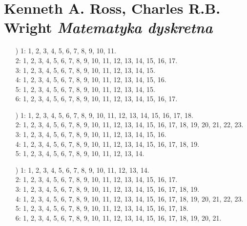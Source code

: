 \documentclass[a4paper,11pt]{article}
\numberwithin{equation}{section}
\begin{document}










\section{Kenneth A. Ross, Charles R.B. Wright
  \textit{Matematyka dyskretna}}

\label{sec:Oznaczenia-i-konwencje}


\begin{itemize}

\item[\romannumeral1)] 1: 1, 2, 3, 4, 5, 6, 7, 8, 9, 10, 11. \\
  2: 1, 2, 3, 4, 5, 6, 7, 8, 9, 10, 11, 12, 13, 14, 15, 16, 17. \\
  3: 1, 2, 3, 4, 5, 6, 7, 8, 9, 10, 11, 12, 13, 14, 15. \\
  4: 1, 2, 3, 4, 5, 6, 7, 8, 9, 10, 11, 12, 13, 14, 15, 16. \\
  5: 1, 2, 3, 4, 5, 6, 7, 8, 9, 10, 11, 12, 13, 14, 15. \\
  6: 1, 2, 3, 4, 5, 6, 7, 8, 9, 10, 11, 12, 13, 14, 15, 16, 17.

\item[\romannumeral2)] 1: 1, 2, 3, 4, 5, 6, 7, 8, 9, 10, 11, 12, 13, 14, 15,
  16, 17, 18. \\
  2: 1, 2, 3, 4, 5, 6, 7, 8, 9, 10, 11, 12, 13, 14, 15, 16, 17, 18, 19, 20,
  21, 22, 23. \\
  3: 1, 2, 3, 4, 5, 6, 7, 8, 9, 10, 11, 12, 13, 14, 15, 16. \\
  4: 1, 2, 3, 4, 5, 6, 7, 8, 9, 10, 11, 12, 13, 14, 15, 16, 17, 18, 19. \\
  5: 1, 2, 3, 4, 5, 6, 7, 8, 9, 10, 11, 12, 13, 14.

\item[\romannumeral3)] 1: 1, 2, 3, 4, 5, 6, 7, 8, 9, 10, 11, 12, 13, 14. \\
  2: 1, 2, 3, 4, 5, 6, 7, 8, 9, 10, 11, 12, 13, 14, 15, 16, 17. \\
  3: 1, 2, 3, 4, 5, 6, 7, 8, 9, 10, 11, 12, 13, 14, 15, 16, 17, 18, 19. \\
  4: 1, 2, 3, 4, 5, 6, 7, 8, 9, 10, 11, 12, 13, 14, 15, 16, 17, 18, 19, 20,
  21, 22, 23. \\
  5: 1, 2, 3, 4, 5, 6, 7, 8, 9, 10, 11, 12, 13, 14, 15, 16, 17, 18. \\
  6: 1, 2, 3, 4, 5, 6, 7, 8, 9, 10, 11, 12, 13, 14, 15, 16, 17, 18, 19, 20,
  21.


\end{itemize}
\end{document}
